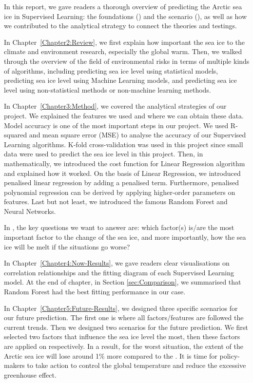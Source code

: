 
In this report, we gave readers a thorough overview of predicting the Arctic sea ice in Supervised Learning: the foundations () and the scenario (), as well as how we contributed to the analytical strategy to connect the theories and testings.

In Chapter~\ref{Chapter2:Review}, we first explain how important the sea ice to the climate and environment research, especially the global warm. Then, we walked through the overview of the ﬁeld of environmental risks in terms of multiple kinds of algorithms, including predicting sea ice level using statistical models, predicting sea ice level using Machine Learning models, and predicting sea ice level using non-statistical methods or non-machine learning methods.

In Chapter~\ref{Chapter3:Method}, we covered the analytical strategies of our project. We explained the features we used and where we can obtain these data. Model accuracy is one of the most important steps in our project. We used R-squared and mean square error (MSE) to analyse the accuracy of our Supervised Learning algorithms. K-fold cross-validation was used in this project since small data were used to predict the sea ice level in this project. Then, in mathematically, we introduced the cost function for Linear Regression algorithm and explained how it worked. On the basis of Linear Regression, we introduced penalised linear regression by adding a penalised term. Furthermore, penalised polynomial regression can be derived by applying higher-order parameters on features. Last but not least, we introduced the famous Random Forest and Neural Networks. 

In , the key questions we want to answer are: which factor(s) is/are the most important factor to the change of the sea ice, and more importantly, how the sea ice will be melt if the situations go worse?

In Chapter~\ref{Chapter4:Now-Results}, we gave readers clear visualisations on correlation relationships and the fitting diagram of each Supervised Learning model. At the end of chapter, in Section \ref{sec:Comparison}, we summarised that Random Forest had the best fitting performance in our case.

In Chapter~\ref{Chapter5:Future-Results}, we designed three specific scenarios for our future prediction. The first one is  where all factors/features are followed the current trends. Then we designed two  scenarios for the future prediction. We first selected two factors that influence the sea ice level the most, then these factors are applied on  respectively. In a result, for the worst situation, the extent of the Arctic sea ice will lose around 1\% more compared to the . It is time for policy-makers to take action to control the global temperature and reduce the excessive greenhouse effect.

